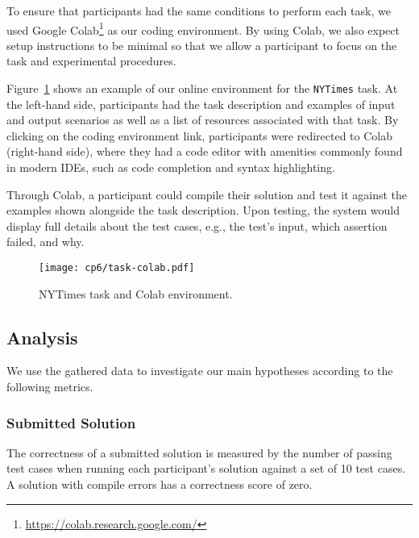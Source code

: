 {To ensure that participants had the same conditions to perform each task, we used Google Colab\footnote{\url{https://colab.research.google.com/}} as our coding environment. 
By using Colab, we also expect setup instructions to be minimal 
so that we allow a participant to focus on the task and experimental procedures.



Figure~\ref{fig:nytimes-task-colab} shows an example of our online environment for the \texttt{NYTimes} task.
At the left-hand side, participants had the task description and examples of input and output scenarios as well as a list of resources associated with that task. 
By clicking on the coding environment link, participants were redirected to Colab (right-hand side),
where they had a code editor with amenities commonly found in modern IDEs, such as code completion and syntax highlighting. 



Through Colab, a participant could compile their solution and test it against the examples shown alongside the task description.
Upon testing, the system would display full details about the test cases, e.g., the test's input, which assertion failed, and why. 




\clearpage

\begin{landscape}
\begin{figure}
    \centering
    \texttt{[image: cp6/task-colab.pdf]}
    \caption{NYTimes task and Colab environment.}
    \label{fig:nytimes-task-colab}
\end{figure}
\end{landscape}

\clearpage


\subsection{Analysis}




We use the gathered data to investigate our main hypotheses according to the following metrics.



\subsubsection{Submitted Solution}

 
The correctness of a submitted solution is measured by the number of passing test cases
when running each participant's solution against a set of 10 test cases. 
A solution with compile errors has a correctness score of zero.


}
